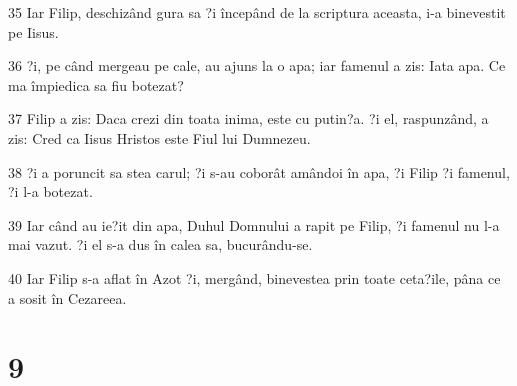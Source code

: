 \par 35 Iar Filip, deschizând gura sa ?i începând de la scriptura aceasta, i-a binevestit pe Iisus.
\par 36 ?i, pe când mergeau pe cale, au ajuns la o apa; iar famenul a zis: Iata apa. Ce ma împiedica sa fiu botezat?
\par 37 Filip a zis: Daca crezi din toata inima, este cu putin?a. ?i el, raspunzând, a zis: Cred ca Iisus Hristos este Fiul lui Dumnezeu.
\par 38 ?i a poruncit sa stea carul; ?i s-au coborât amândoi în apa, ?i Filip ?i famenul, ?i l-a botezat.
\par 39 Iar când au ie?it din apa, Duhul Domnului a rapit pe Filip, ?i famenul nu l-a mai vazut. ?i el s-a dus în calea sa, bucurându-se.
\par 40 Iar Filip s-a aflat în Azot ?i, mergând, binevestea prin toate ceta?ile, pâna ce a sosit în Cezareea.

\chapter{9}

